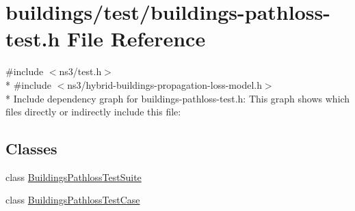 \hypertarget{buildings-pathloss-test_8h}{}\section{buildings/test/buildings-\/pathloss-\/test.h File Reference}
\label{buildings-pathloss-test_8h}
{\ttfamily \#include $<$ns3/test.\+h$>$}\\*
{\ttfamily \#include $<$ns3/hybrid-\/buildings-\/propagation-\/loss-\/model.\+h$>$}\\*
Include dependency graph for buildings-\/pathloss-\/test.h\+:
This graph shows which files directly or indirectly include this file\+:
\subsection*{Classes}
\begin{DoxyCompactItemize}
\item 
class \hyperlink{classBuildingsPathlossTestSuite}{Buildings\+Pathloss\+Test\+Suite}
\item 
class \hyperlink{classBuildingsPathlossTestCase}{Buildings\+Pathloss\+Test\+Case}
\end{DoxyCompactItemize}
